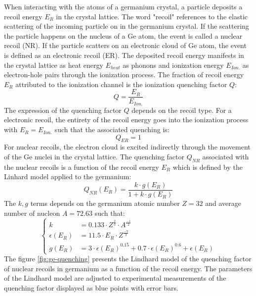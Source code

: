 When interacting with the atoms of a germanium crystal, a particle deposits a recoil energy $E_R$ in the crystal lattice. The word "recoil" references to the elastic scattering of the incoming particle on in the germanium crystal. If the scattering the particle happens on the nucleus of a Ge atom, the event is called a nuclear recoil (NR). If the particle scatters on an electronic cloud of Ge atom, the event is defined as an electronic recoil (ER). The deposited recoil energy manifests in the crystal lattice as heat energy $E_{heat}$ as phonons and ionization energy $E_{Ion.}$ as electron-hole pairs through the ionization process. The fraction of recoil energy $E_R$ attributed to the ionization channel is the ionization quenching factor $Q$:
\begin{equation}
Q = \frac{E_R}{E_{Ion.}}
\end{equation}
The expression of the quenching factor $Q$ depends on the recoil type. For a electronic recoil, the entirety of the recoil energy goes into the ionization process with $E_R = E_{Ion.}$ such that the associated quenching is:
\begin{equation}
Q_{ER} = 1
\end{equation}
For nuclear recoils, the electron cloud is excited indirectly through the movement of the Ge nuclei in the crystal lattice. The quenching factor $Q_{NR}$ associated with the nuclear recoils is a function of the recoil energy $E_R$ which is defined by the Linhard model applied to the germanium:
\begin{equation}
\label{eq:lindhard}
Q_{NR}(E_R) = \frac{k \cdot g(E_R)}{1+k \cdot g(E_R)}
\end{equation}
The $k,g$ terms depends on the germanium atomic number $Z=32$ and average number of nucleon $A=72.63$ such that:
\begin{equation}
\begin{cases}
k &= 0.133 \cdot Z^\frac{2}{3} \cdot A^\frac{-1}{2}
\\
\epsilon(E_R) &= 11.5 \cdot E_R \cdot Z^\frac{-7}{3}
\\
g(E_R) &= 3 \cdot \epsilon(E_R)^{0.15} + 0.7 \cdot\epsilon(E_R)^{0.6} + \epsilon(E_R) 
\end{cases}
\end{equation}
The figure \ref{fig:ge-quenching} presents the Lindhard model of the quenching factor of nuclear recoils in germanium as a function of the recoil energy. The parameters of the Lindhard model are adjusted to experimental measurements of the quenching factor displayed as blue points with error bars. 

